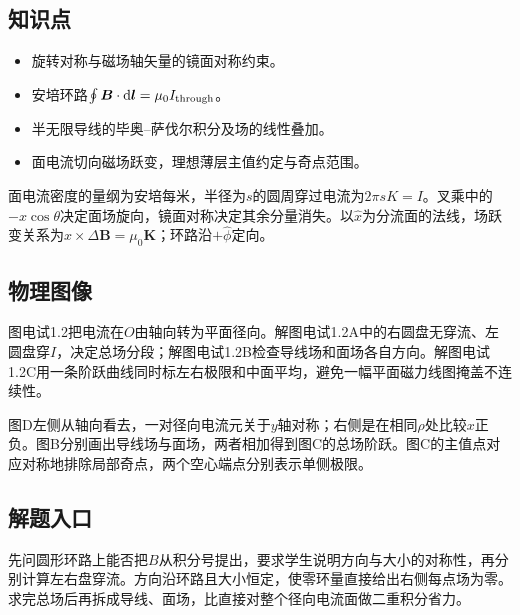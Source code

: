 \documentclass[UTF8,fontset=fandol,a4paper,11pt]{ctexart}
\begin{document}


\subsection*{知识点}

\begin{itemize}
\item 旋转对称与磁场轴矢量的镜面对称约束。
\item 安培环路$\oint\boldsymbol B\cdot\mathrm d\boldsymbol l=\mu_0I_{\rm through}$。
\item 半无限导线的毕奥--萨伐尔积分及场的线性叠加。
\item 面电流切向磁场跃变，理想薄层主值约定与奇点范围。
\end{itemize}

面电流密度的量纲为安培每米，半径为$s$的圆周穿过电流为$2\pi sK=I$。叉乘中的$-x\cos\theta$决定面场旋向，镜面对称决定其余分量消失。以$\hat x$为分流面的法线，场跃变关系为$\hat x\times\Delta\boldsymbol B=\mu_0\boldsymbol K$；环路沿$+\hat\phi$定向。



\subsection*{物理图像}

图电试1.2把电流在$O$由轴向转为平面径向。解图电试1.2A中的右圆盘无穿流、左圆盘穿$I$，决定总场分段；解图电试1.2B检查导线场和面场各自方向。解图电试1.2C用一条阶跃曲线同时标左右极限和中面平均，避免一幅平面磁力线图掩盖不连续性。

图D左侧从轴向看去，一对径向电流元关于$y$轴对称；右侧是在相同$\rho$处比较$x$正负。图B分别画出导线场与面场，两者相加得到图C的总场阶跃。图C的主值点对应对称地排除局部奇点，两个空心端点分别表示单侧极限。



\subsection*{解题入口}

先问圆形环路上能否把$B$从积分号提出，要求学生说明方向与大小的对称性，再分别计算左右盘穿流。方向沿环路且大小恒定，使零环量直接给出右侧每点场为零。求完总场后再拆成导线、面场，比直接对整个径向电流面做二重积分省力。
\end{document}
